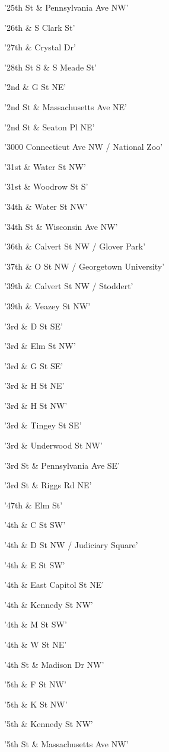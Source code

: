 \documentclass[11pt]{article}
\begin{document}
\begin{enumerate*}
\item '25th St \& Pennsylvania Ave NW'
\item '26th \& S Clark St'
\item '27th \& Crystal Dr'
\item '28th St S \& S Meade St'
\item '2nd \& G St NE'
\item '2nd St \& Massachusetts Ave NE'
\item '2nd St \& Seaton Pl NE'
\item '3000 Connecticut Ave NW / National Zoo'
\item '31st \& Water St NW'
\item '31st \& Woodrow St S'
\item '34th \& Water St NW'
\item '34th St \& Wisconsin Ave NW'
\item '36th \& Calvert St NW / Glover Park'
\item '37th \& O St NW / Georgetown University'
\item '39th \& Calvert St NW / Stoddert'
\item '39th \& Veazey St NW'
\item '3rd \& D St SE'
\item '3rd \& Elm St NW'
\item '3rd \& G St SE'
\item '3rd \& H St NE'
\item '3rd \& H St NW'
\item '3rd \& Tingey St SE'
\item '3rd \& Underwood St NW'
\item '3rd St \& Pennsylvania Ave SE'
\item '3rd St \& Riggs Rd NE'
\item '47th \& Elm St'
\item '4th \& C St SW'
\item '4th \& D St NW / Judiciary Square'
\item '4th \& E St SW'
\item '4th \& East Capitol St NE'
\item '4th \& Kennedy St NW'
\item '4th \& M St SW'
\item '4th \& W St NE'
\item '4th St \& Madison Dr NW'
\item '5th \& F St NW'
\item '5th \& K St NW'
\item '5th \& Kennedy St NW'
\item '5th St \& Massachusetts Ave NW'

\end{enumerate*}
\end{document}
